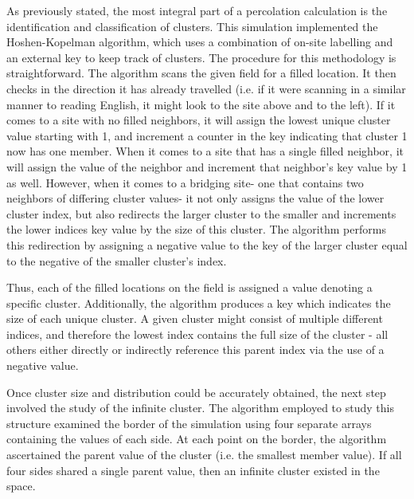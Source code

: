\documentclass[twocolumn,prb,amsmath,amssymb,amsfonts]{revtex4}
\begin{document}
As previously stated, the most integral part of a percolation calculation is the identification and classification of clusters. This simulation implemented the Hoshen-Kopelman algorithm, which uses a combination of on-site labelling and an external key to keep track of clusters. The procedure for this methodology is straightforward. The algorithm scans the given field for a filled location. It then checks in the direction it has already travelled (i.e. if it were scanning in a similar manner to reading English, it might look to the site above and to the left). If it comes to a site with no filled neighbors, it will assign the lowest unique cluster value starting with 1, and increment a counter in the key indicating that cluster 1 now has one member. When it comes to a site that has a single filled neighbor, it will assign the value of the neighbor and increment that neighbor's key value by 1 as well. However, when it comes to a bridging site- one that contains two neighbors of differing cluster values- it not only assigns the value of the lower cluster index, but also redirects the larger cluster to the smaller and increments the lower indices key value by the size of this cluster. The algorithm performs this redirection by assigning a negative value to the key of the larger cluster equal to the negative of the smaller cluster's index. 

Thus, each of the filled locations on the field is assigned a value denoting a specific cluster. Additionally, the algorithm produces a key which indicates the size of each unique cluster. A given cluster might consist of multiple different indices, and therefore the lowest index contains the full size of the cluster - all others either directly or indirectly reference this parent index via the use of a negative value.

Once cluster size and distribution could be accurately obtained, the next step involved the study of the infinite cluster. The algorithm employed to study this structure examined the border of the simulation using four separate arrays containing the values of each side. At each point on the border, the algorithm ascertained the parent value of the cluster (i.e. the smallest member value). If all four sides shared a single parent value, then an infinite cluster existed in the space.
\end{document}
